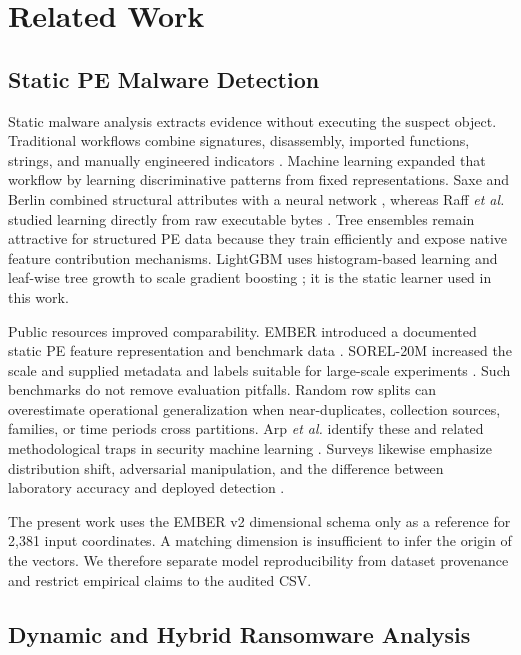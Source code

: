 \section{Related Work}
\label{sec:related}

\subsection{Static PE Malware Detection}

Static malware analysis extracts evidence without executing the suspect object.
Traditional workflows combine signatures, disassembly, imported functions,
strings, and manually engineered indicators \cite{sikorski2012practical}. Machine
learning expanded that workflow by learning discriminative patterns from fixed
representations. Saxe and Berlin combined structural attributes with a neural
network \cite{saxe2015deep}, whereas Raff \emph{et al.} studied learning directly
from raw executable bytes \cite{raff2018malware}. Tree ensembles remain attractive
for structured PE data because they train efficiently and expose native feature
contribution mechanisms. LightGBM uses histogram-based learning and leaf-wise
tree growth to scale gradient boosting \cite{ke2017lightgbm}; it is the static
learner used in this work.

Public resources improved comparability. EMBER introduced a documented static PE
feature representation and benchmark data \cite{anderson2018ember}. SOREL-20M
increased the scale and supplied metadata and labels suitable for large-scale
experiments \cite{harang2020sorel}. Such benchmarks do not remove evaluation
pitfalls. Random row splits can overestimate operational generalization when
near-duplicates, collection sources, families, or time periods cross partitions.
Arp \emph{et al.} identify these and related methodological traps in security
machine learning \cite{arp2022dos}. Surveys likewise emphasize distribution
shift, adversarial manipulation, and the difference between laboratory accuracy
and deployed detection \cite{ucci2019survey,gibert2020rise}.

The present work uses the EMBER v2 dimensional schema only as a reference for
2,381 input coordinates. A matching dimension is insufficient to infer the
origin of the vectors. We therefore separate model reproducibility from dataset
provenance and restrict empirical claims to the audited CSV.

\subsection{Dynamic and Hybrid Ransomware Analysis}

